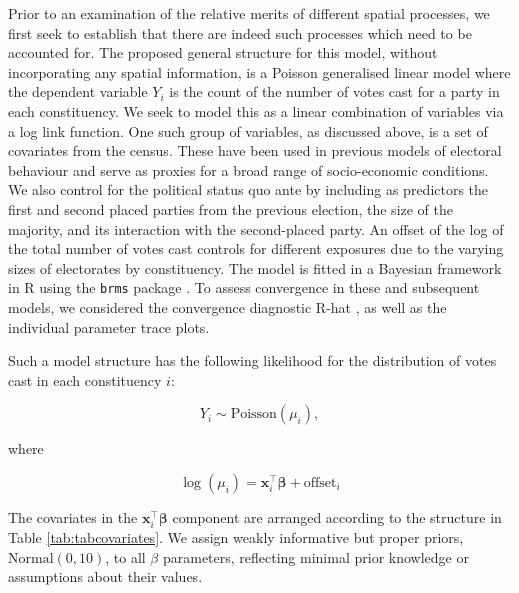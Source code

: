 \documentclass[webpdf,large,contemporary,namedate]{oup-authoring-template}
\theoremstyle{thmstyleone}
\theoremstyle{thmstyletwo}
\theoremstyle{thmstylethree}
\begin{document}
Prior to an examination of the relative merits of different spatial
processes, we first seek to establish that there are indeed such
processes which need to be accounted for. The proposed general structure
for this model, without incorporating any spatial information, is a
Poisson generalised linear model where the dependent variable \(Y_i\) is
the count of the number of votes cast for a party in each constituency.
We seek to model this as a linear combination of variables via a log
link function. One such group of variables, as discussed above, is a set
of covariates from the census. These have been used in previous models
of electoral behaviour and serve as proxies for a broad range of
socio-economic conditions. We also control for the political status quo
ante by including as predictors the first and second placed parties from
the previous election, the size of the majority, and its interaction
with the second-placed party. An offset of the log of the total number
of votes cast controls for different exposures due to the varying sizes
of electorates by constituency. The model is fitted in a Bayesian
framework in R using the \texttt{brms} package \citep{brms2017}. To
assess convergence in these and subsequent models, we considered the
convergence diagnostic R-hat \citep{Vehtari2021}, as well as the
individual parameter trace plots.

Such a model structure has the following likelihood for the distribution
of votes cast in each constituency \(i\):

\[
Y_i \sim \text{Poisson}(\mu_i), 
\]

where

\[
\log(\mu_i) = \mathbf{x}_i^\top \boldsymbol{\beta} + \text{offset}_i
\]

The covariates in the \(\mathbf{x}_i^\top \boldsymbol{\beta}\) component
are arranged according to the structure in Table
\ref{tab:tabcovariates}. We assign weakly informative but proper priors,
\(\text{Normal}(0, 10)\), to all \(\beta\) parameters, reflecting
minimal prior knowledge or assumptions about their values.
\end{document}
